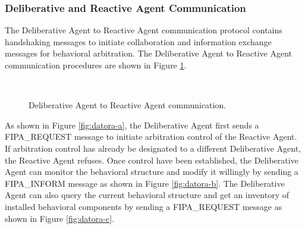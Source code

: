     \subsubsection{Deliberative and Reactive Agent Communication}
      The Deliberative Agent to Reactive Agent communication protocol contains 
        handshaking messages to initiate collaboration and information exchange 
        messages for behavioral arbitration.
      The Deliberative Agent to Reactive Agent communication procedures are 
        shown in Figure \ref{fig:datora}.
      \begin{figure}%
      \begin{center}
        \hspace{.5in}
        \\
      \end{center}
      \caption{Deliberative Agent to Reactive Agent communication.}
      \label{fig:datora}
      \end{figure}
      As shown in Figure \ref{fig:datora-a}, the Deliberative Agent first sends 
        a FIPA\_REQUEST message to initiate arbitration control of the Reactive 
        Agent.
      If arbitration control has already be designated to a different 
        Deliberative Agent, the Reactive Agent refuses.
      Once control have been established, the Deliberative Agent can monitor 
        the behavioral structure and modify it willingly by sending a 
        FIPA\_INFORM message as shown in Figure \ref{fig:datora-b}.
      The Deliberative Agent can also query the current behavioral structure 
        and get an inventory of installed behavioral components by sending a 
        FIPA\_REQUEST message as shown in Figure \ref{fig:datora-c}.

